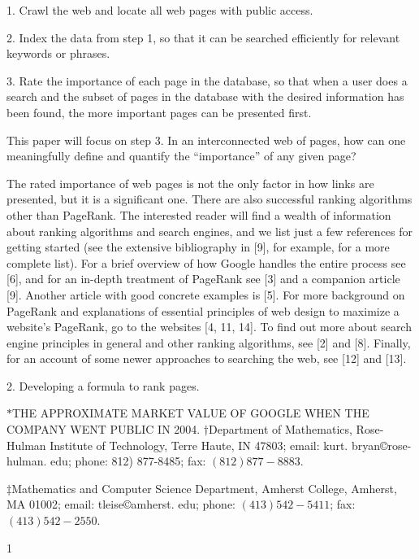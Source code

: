\documentclass[a4paper,10pt]{article}
\begin{document}
1. Crawl the web and locate all web pages with public access.

2. Index the data from step 1, so that it can be searched efficiently for relevant keywords or phrases.

3. Rate the importance of each page in the database, so that when a user does a search and the subset of pages in the database with the desired information has been found, the more important pages can be presented first.

This paper will focus on step 3. In an interconnected web of pages, how can one meaningfully define and quantify the ``importance'' of any given page?

The rated importance of web pages is not the only factor in how links are presented, but it is a significant one. There are also successful ranking algorithms other than PageRank. The interested reader will find a wealth of information about ranking algorithms and search engines, and we list just a few references for getting started (see the extensive bibliography in [9], for example, for a more complete list). For a brief overview of how Google handles the entire process see [6], and for an in-depth treatment of PageRank see [3] and a companion article [9]. Another article with good concrete examples is [5]. For more background on PageRank and explanations of essential principles of web design to maximize a website's PageRank, go to the websites [4, 11, 14]. To find out more about search engine principles in general and other ranking algorithms, see [2] and [8]. Finally, for an account of some newer approaches to searching the web, see [12] and [13].

2. Developing a formula to rank pages.

$*$THE APPROXIMATE MARKET VALUE OF GOOGLE WHEN THE COMPANY WENT PUBLIC IN 2004. $\dagger$Department of Mathematics, Rose-Hulman Institute of Technology, Terre Haute, $\mathrm{I}\mathrm{N}$ 47803; email: kurt. bryan\copyright rose-hulman. $\mathrm{e}\mathrm{d}\mathrm{u}$; phone: 812) 877-8485; fax: $(812)877-8883$.

$\ddagger$Mathematics and Computer Science Department, Amherst College, Amherst, $\mathrm{M}\mathrm{A}$ 01002; email: tleise\copyright amherst. $\mathrm{e}\mathrm{d}\mathrm{u}$; phone: $(413)542-5411$; fax: $(413)542-2550$.

1
\end{document}
